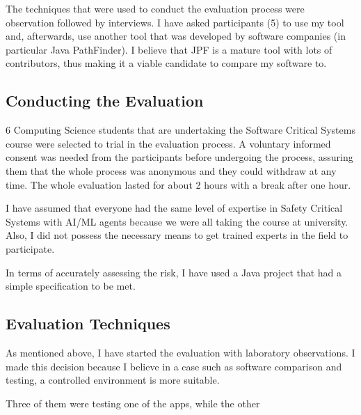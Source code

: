 \documentclass[paper=a4, fontsize=11pt]{scrartcl} %
\numberwithin{equation}{section} %
\numberwithin{figure}{section} %
\numberwithin{table}{section} %
\begin{document}

The techniques that were used to conduct the evaluation process were observation followed by interviews. I have asked participants (5) to use my tool and, afterwards, use another tool that was developed by software companies (in particular Java PathFinder). I believe that JPF is a mature tool with lots of contributors, thus making it a viable candidate to compare my software to.

\subsection{Conducting the Evaluation}

\par
6 Computing Science students that are undertaking the Software Critical Systems course were selected to trial in the evaluation process. A voluntary informed consent was needed from the participants before undergoing the process, assuring them that the whole process was anonymous and they could withdraw at any time. The whole evaluation lasted for about 2 hours with a break after one hour.\\

\par
I have assumed that everyone had the same level of expertise in Safety Critical Systems with AI/ML agents because we were all taking the course at university. Also, I did not possess the necessary means to get trained experts in the field to participate. \\

\par
In terms of accurately assessing the risk, I have used a Java project that had a simple specification to be met. 


\subsection{Evaluation Techniques}

\par
As mentioned above, I have started the evaluation with laboratory observations. I made this decision because I believe in a case such as software comparison and testing, a controlled environment is more suitable. \\

\par
Three of them were testing one of the apps, while the other 
\end{document}
